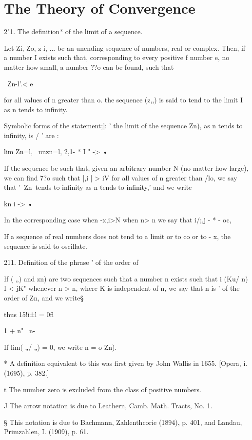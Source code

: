 \chapter{The Theory of Convergence} 

2"1. The definition* of the limit of a sequence.

Let Zi, Zo, z-i, ... be an unending sequence of numbers, real or
complex. Then, if a number I exists such that, corresponding to every
positive f number e, no matter how small, a number ??o can be found,
such that

\ Zn-l'.< e

for all values of n greater than o. the sequence (z,,) is said to tend
to the limit I as n tends to infinity.

Symbolic forms of the statement;]: ' the limit of the sequence Zn), as
n tends to infinity, is / ' are :

lim Zn=l, \ unzn=l, 2,1- * I " -> •

If the sequence be such that, given an arbitrary number N (no matter
how large), we can find 7?o such that |,i | > iV for all values of n
greater than /lo, we say that '\ Zn\ tends to infinity as n tends to
infinity,' and we write

kn i -> •

In the corresponding case when -x,i>N when n> n we say that i/;,j - *
- oc,

If a sequence of real numbers does not tend to a limit or to co or to
- x, the sequence is said to oscillate.

211. Definition of the phrase ' of the order of

If ( „) and zn) are two sequences such that a number n exists such
that i (Ku/ n) I < jK" whenever n > n, where K is independent of n,
we say that n is ' of the order of Zn, and we write§

thus 15!i±l = 0fl

1 + n" \ n-

If lim( „/ „) = 0, we write n = o Zn).

* A definition equivalent to this was first given by John Wallis in
1655. [Opera, i. (1695), p. 382.]

t The number zero is excluded from the class of positive numbers.

J The arrow notation is due to Leathern, Camb. Math. Tracts, No. 1.

§ This notation is due to Bachmann, Zahlenthcorie (1894), p. 401, and
Landau, Primzahlen, I. (1909), p. 61.



